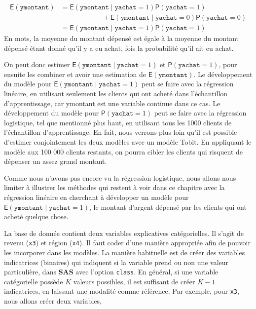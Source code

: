 \documentclass[
  11pt,
  letterpaper,
]{book}
\theoremstyle{definition}
\theoremstyle{definition}
\theoremstyle{definition}
\theoremstyle{remark}
\begin{document}
\begin{align*} 
{\mathsf E}\left(\texttt{ymontant}\right) &= {\mathsf E}\left(\texttt{ymontant} \mid \texttt{yachat}=1\right) {\mathsf P}\left(\texttt{yachat}=1\right) \\& \qquad \qquad \qquad +
{\mathsf E}\left(\texttt{ymontant} \mid \texttt{yachat}=0\right) {\mathsf P}\left(\texttt{yachat}=0\right) \\
 &= {\mathsf E}\left(\texttt{ymontant} \mid \texttt{yachat}=1\right) {\mathsf P}\left(\texttt{yachat}=1\right)
\end{align*}
En mots, la moyenne du montant dépensé est égale à la moyenne du montant dépensé étant donné qu'il y a eu achat, fois la probabilité qu'il ait eu achat.

On peut donc estimer \({\mathsf E}\left(\texttt{ymontant} \mid \texttt{yachat}=1\right)\) et \({\mathsf P}\left(\texttt{yachat}=1\right)\), pour ensuite les combiner et avoir une estimation de \({\mathsf E}\left(\texttt{ymontant}\right)\). Le développement du modèle pour \({\mathsf E}\left(\texttt{ymontant} \mid \texttt{yachat}=1\right)\) peut se faire avec la régression linéaire, en utilisant seulement les clients qui ont acheté dans l'échantillon d'apprentissage, car ymontant est une variable continue dans ce cas. Le développement du modèle pour \({\mathsf P}\left(\texttt{yachat}=1\right)\) peut se faire avec la régression logistique, tel que mentionné plus haut, en utilisant tous les 1000 clients de l'échantillon d'apprentissage. En fait, nous verrons plus loin qu'il est possible d'estimer conjointement les deux modèles avec un modèle Tobit. En appliquant le modèle aux 100 000 clients restants, on pourra cibler les clients qui risquent de dépenser un assez grand montant.

Comme nous n'avons pas encore vu la régression logistique, nous allons nous limiter à illustrer les méthodes qui restent à voir dans ce chapitre avec la régression linéaire en cherchant à développer un modèle pour \({\mathsf E}\left(\texttt{ymontant} \mid \texttt{yachat}=1\right)\), le montant d'argent dépensé par les clients qui ont acheté quelque chose.

La base de donnée contient deux variables explicatives catégorielles. Il s'agit de revenu (\texttt{x3}) et région (\texttt{x4}). Il faut coder d'une manière appropriée afin de pouvoir les incorporer dans les modèles. La manière habituelle est de créer des variables indicatrices (binaires) qui indiquent si la variable prend ou non une valeur particulière, dans \textbf{SAS} avec l'option \texttt{class}. En général, si une variable catégorielle possède \(K\) valeurs possibles, il est suffisant de créer \(K-1\) indicatrices, en laissant une modalité comme référence. Par exemple, pour \texttt{x3}, nous allons créer deux variables,
\end{document}

